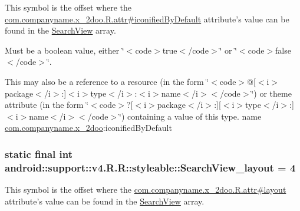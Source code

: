 This symbol is the offset where the \hyperlink{classcom_1_1companyname_1_1x__2doo_1_1_r_1_1attr_d87051f7c5a80c2160849af1891e35f9}{com.companyname.x\_\-2doo.R.attr\#iconifiedByDefault} attribute's value can be found in the \hyperlink{classandroid_1_1support_1_1v4_1_1_r_1_1styleable_63a589da97c59fb7eebd9759edb31f0d}{SearchView} array.

Must be a boolean value, either \char`\"{}$<$code$>$true$<$/code$>$\char`\"{} or \char`\"{}$<$code$>$false$<$/code$>$\char`\"{}. 

This may also be a reference to a resource (in the form \char`\"{}$<$code$>$@\mbox{[}$<$i$>$package$<$/i$>$:\mbox{]}$<$i$>$type$<$/i$>$:$<$i$>$name$<$/i$>$$<$/code$>$\char`\"{}) or theme attribute (in the form \char`\"{}$<$code$>$?\mbox{[}$<$i$>$package$<$/i$>$:\mbox{]}\mbox{[}$<$i$>$type$<$/i$>$:\mbox{]}$<$i$>$name$<$/i$>$$<$/code$>$\char`\"{}) containing a value of this type.  name \hyperlink{namespacecom_1_1companyname_1_1x__2doo}{com.companyname.x\_\-2doo}:iconifiedByDefault \hypertarget{classandroid_1_1support_1_1v4_1_1_r_1_1styleable_70f15e7a0ccd231aa82768bfe48b1fec}{
\subsubsection[{SearchView\_\-layout}]{\setlength{\rightskip}{0pt plus 5cm}static final int android::support::v4.R.R::styleable::SearchView\_\-layout = 4}}
\label{classandroid_1_1support_1_1v4_1_1_r_1_1styleable_70f15e7a0ccd231aa82768bfe48b1fec}


This symbol is the offset where the \hyperlink{classcom_1_1companyname_1_1x__2doo_1_1_r_1_1attr_ba6f508b84c46daec1c85d2d34a365c9}{com.companyname.x\_\-2doo.R.attr\#layout} attribute's value can be found in the \hyperlink{classandroid_1_1support_1_1v4_1_1_r_1_1styleable_63a589da97c59fb7eebd9759edb31f0d}{SearchView} array.


